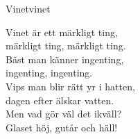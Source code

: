 \begin{song}{Vinet}{vinet}
\begin{vers}
Vinet är ett märkligt ting,\\
märkligt ting, märkligt ting.\\
Bäst man känner ingenting,\\
ingenting, ingenting.\\
Vips man blir rätt yr i hatten,\\
dagen efter älskar vatten.\\
Men vad gör väl det ikväll?\\
Glaset höj, gutår och häll!\\
\end{vers}
\end{song}
